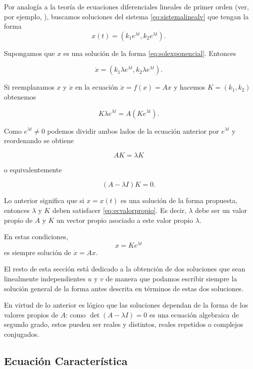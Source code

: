 Por analogía a la teoría de ecuaciones diferenciales lineales de primer orden (ver, por ejemplo, \cite{zillcull,boycediprima}), buscamos soluciones del sistema \ref{eq:sistemalinealv} que tengan la forma
\begin{equation} \label{eq:solexponencial}
x(t) = (k_1e^{\lambda t}, k_2e^{\lambda t}).
\end{equation}

Supongamos que $x$ es una solución de la forma \ref{eq:solexponencial}. Entonces

$$ \dot{x} = (k_1 \lambda e^{\lambda t}, k_2 \lambda e^{\lambda t}). $$

Si reemplazamos $x$ y $\dot{x}$ en la ecuación $\dot{x} = f(x) = Ax$ y hacemos $K = (k_1, k_2)$ obtenemos

$$
	K \lambda e^{\lambda t} = A (Ke^{\lambda t}).
$$

Como $e^{\lambda t} \neq 0$ podemos dividir ambos lados de la ecuación anterior por $e^{\lambda t}$ y reordenando se obtiene

$$ AK = \lambda K$$

o equivalentemente

\begin{equation} \label{eq:ecvalorpropio}
	(A - \lambda I) K = 0.
\end{equation}

Lo anterior significa que si $x = x(t)$ es una solución de la forma propuesta, entonces $\lambda$ y $K$ deben satisfacer \ref{eq:ecvalorpropio}. Es decir, $\lambda$ debe ser un valor propio de $A$ y $K$ un vector propio asociado a este valor propio $\lambda$.

En estas condiciones, $$ x = K e^{\lambda t}$$ es siempre solución de $\dot{x} = Ax$.

El resto de esta sección está dedicado a la obtención de dos soluciones que sean linealmente independientes $u$ y $v$ de manera que podamos escribir siempre la solución general de la forma antes descrita en términos de estas dos soluciones.

En virtud de lo anterior es lógico que las soluciones dependan de la forma de los valores propios de $A$: como $\det(A - \lambda I) = 0$ es una ecuación algebraica de segundo grado, estos pueden ser reales y distintos, reales repetidos o complejos conjugados.

\subsection{Ecuación Característica}

